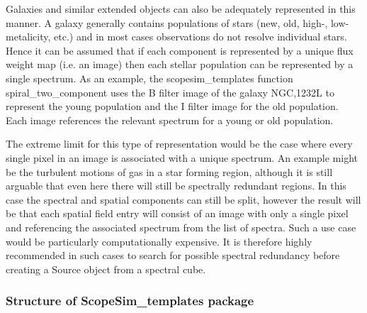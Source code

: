 Galaxies and similar extended objects can also be adequately represented in this manner.
A galaxy generally contains populations of stars (new, old, high-, low-metalicity, etc.) and in most cases observations do not resolve individual stars.
Hence it can be assumed that if each component is represented by a unique flux weight map (i.e. an image) then each stellar population can be represented by a single spectrum.
As an example, the scopesim\_templates function \textquotedbl{}spiral\_two\_component\textquotedbl{} uses the B filter image of the galaxy NGC,1232L to represent the young population and the I filter image for the old population.
Each image references the relevant spectrum for a young or old population.

The extreme limit for this type of representation would be the case where every single pixel in an image is associated with a unique spectrum.
An example might be the turbulent motions of gas in a star forming region, although it is still arguable that even here there will still be spectrally redundant regions.
In this case the spectral and spatial components can still be split, however the result will be that each spatial field entry will consist of an image with only a single pixel and referencing the associated spectrum from the list of spectra.
Such a use case would be particularly computationally expensive.
It is therefore highly recommended in such cases to search for possible spectral redundancy before creating a \textquotedbl{}Source\textquotedbl{} object from a spectral cube.



\subsubsection{Structure of ScopeSim\_templates package%
  \label{structure-of-scopesim-templates-package}%
}

